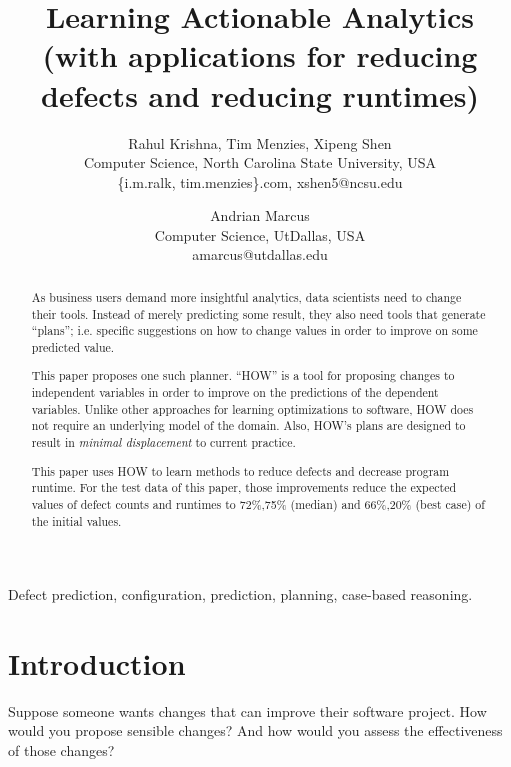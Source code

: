 \documentclass[conference]{IEEEtran}
\title{Learning Actionable Analytics 
 (with applications for reducing defects and reducing runtimes)}
\author{
%
%
Rahul Krishna, Tim Menzies, Xipeng Shen\\
        Computer Science, North Carolina State University, USA\\
       \{i.m.ralk, tim.menzies\}\@gmail.com, xshen5@ncsu.edu
\and
 Andrian Marcus\\
       Computer Science, UtDallas, USA \\
       amarcus@utdallas.edu }
\begin{document}
  \maketitle
  
  
   
  \begin{abstract}
 As business users demand more insightful
 analytics, data scientists need to change
 their tools. Instead of merely predicting 
 some result, they also need tools that generate ``plans'';
 i.e. specific suggestions on  how to change values in order to
 improve on some predicted value.
 
 This paper proposes one such planner. ``HOW'' is a 
 tool for proposing changes to independent
 variables in order to improve on 
 the predictions of the dependent variables. Unlike other approaches
 for learning optimizations to software, HOW does not require
 an underlying model of the domain. Also, HOW's plans
 are designed to result in {\em minimal displacement}
 to current practice.
 
 This paper uses  HOW to learn methods
 to reduce defects and decrease program runtime.
 For the test data of this paper, those improvements   reduce
 the expected values of defect counts and  runtimes to    
 72\%,75\%  (median) and 66\%,20\% (best case) of the initial values.
  \end{abstract}
  \begin{IEEEkeywords}
Defect prediction, configuration, prediction, planning, case-based reasoning.
  \end{IEEEkeywords}
  
\section{Introduction}
Suppose someone wants changes that can improve their software project. How would you propose
sensible changes? And how would you assess the effectiveness of those changes?
\end{document}
